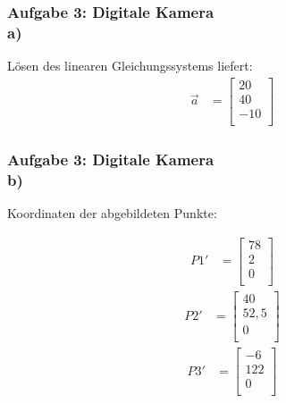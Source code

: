 \documentclass[accentcolor=tud9c,colorbacktitle,inverttitle,landscape,german,presentation,t]{tudbeamer}
\begin{document}
	\begin{frame}
		\frametitle{Aufgabe 3: Digitale Kamera \\ a)}
		
		L\"osen des linearen Gleichungssystems liefert:
		\begin{align*}
		\vec{a} &=
		\begin{bmatrix}
		20 \\
		40  \\
		-10 \\
		\end{bmatrix}
		\end{align*}
		
	\end{frame}
	
	\begin{frame}
		\frametitle{Aufgabe 3: Digitale Kamera \\ b)}
		
		Koordinaten der abgebildeten Punkte:
		
		\begin{align*}
			P1' &=
			\begin{bmatrix}
			78 \\
			2  \\
			0 \\
			\end{bmatrix}
		\end{align*}
		\begin{align*}
		P2' &=
		\begin{bmatrix}
		40 \\
		52,5  \\
		0 \\
		\end{bmatrix}
		\end{align*}
		\begin{align*}
		P3' &=
		\begin{bmatrix}
		-6 \\
		122  \\
		0 \\
		\end{bmatrix}
		\end{align*}
	\end{frame}
	
\end{document}
